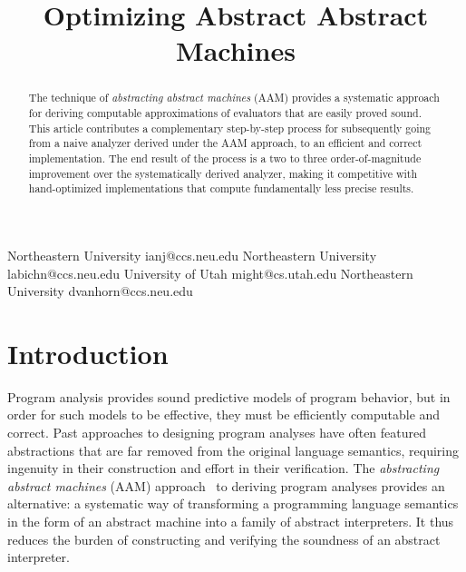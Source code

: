 \documentclass[9pt]{sigplanconf} %
\newcommand{\naive}{naive}
\begin{document}
\copyrightdata{[to be supplied]}


\title{Optimizing Abstract Abstract Machines}

           {Northeastern University}
           {ianj@ccs.neu.edu}
           {Northeastern University}
           {labichn@ccs.neu.edu}
           {University of Utah}
           {might@cs.utah.edu}
           {Northeastern University}
           {dvanhorn@ccs.neu.edu}
\maketitle

\begin{abstract}
The technique of \emph{abstracting abstract machines} (AAM) provides a systematic approach for deriving computable approximations of evaluators that are easily proved sound.
%
This article contributes a complementary step-by-step process for subsequently going from a \naive{} analyzer derived under the AAM approach, to an efficient and correct implementation.
%
The end result of the process is a two to three order-of-magnitude improvement over the systematically derived analyzer, making it competitive with hand-optimized implementations that compute fundamentally less precise results.
\end{abstract}




\section{Introduction}

Program analysis provides sound predictive models of program behavior, but in order for such models to be effective, they must be efficiently computable and correct.
%
Past approaches to designing program analyses have often featured abstractions that are far removed from the original language semantics, requiring ingenuity in their construction and effort in their verification.
%
The \emph{abstracting abstract machines} (AAM) approach~\cite{dvanhorn:VanHorn2011Abstracting,dvanhorn:VanHorn2012Systematic} to deriving program analyses provides an alternative: a systematic way of transforming a programming language semantics in the form of an abstract machine into a family of abstract interpreters.
%
It thus reduces the burden of constructing and verifying the soundness of an abstract interpreter.
%
\end{document}
